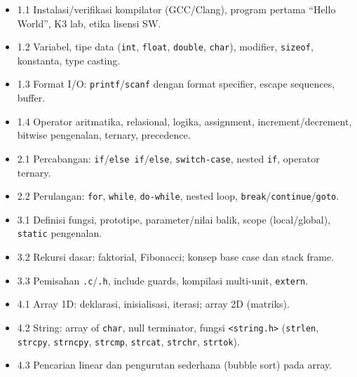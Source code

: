 \documentclass[12pt,a4paper]{article}
\begin{document}
\begin{description}[style=nextline,leftmargin=*]
  \item[CPMK-1:] \hfill
  \begin{itemize}[nosep]
    \item 1.1 Instalasi/verifikasi kompilator (GCC/Clang), program pertama ``Hello World'', K3 lab, etika lisensi SW.
    \item 1.2 Variabel, tipe data (\texttt{int}, \texttt{float}, \texttt{double}, \texttt{char}), modifier, \texttt{sizeof}, konstanta, type casting.
    \item 1.3 Format I/O: \texttt{printf}/\texttt{scanf} dengan format specifier, escape sequences, buffer.
    \item 1.4 Operator aritmatika, relasional, logika, assignment, increment/decrement, bitwise pengenalan, ternary, precedence.
  \end{itemize}

  \item[CPMK-2:] \hfill
  \begin{itemize}[nosep]
    \item 2.1 Percabangan: \texttt{if}/\texttt{else if}/\texttt{else}, \texttt{switch-case}, nested \texttt{if}, operator ternary.
    \item 2.2 Perulangan: \texttt{for}, \texttt{while}, \texttt{do-while}, nested loop, \texttt{break}/\texttt{continue}/\texttt{goto}.
  \end{itemize}

  \item[CPMK-3:] \hfill
  \begin{itemize}[nosep]
    \item 3.1 Definisi fungsi, prototipe, parameter/nilai balik, scope (local/global), \texttt{static} pengenalan.
    \item 3.2 Rekursi dasar: faktorial, Fibonacci; konsep base case dan stack frame.
    \item 3.3 Pemisahan \texttt{.c}/\texttt{.h}, include guards, kompilasi multi-unit, \texttt{extern}.
  \end{itemize}

  \item[CPMK-4:] \hfill
  \begin{itemize}[nosep]
    \item 4.1 Array 1D: deklarasi, inisialisasi, iterasi; array 2D (matriks).
    \item 4.2 String: array of \texttt{char}, null terminator, fungsi \texttt{<string.h>} (\texttt{strlen}, \texttt{strcpy}, \texttt{strncpy}, \texttt{strcmp}, \texttt{strcat}, \texttt{strchr}, \texttt{strtok}).
    \item 4.3 Pencarian linear dan pengurutan sederhana (bubble sort) pada array.
  \end{itemize}


\end{description}
\end{document}
